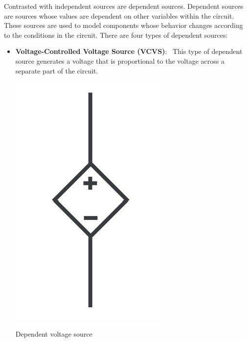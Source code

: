 \documentclass[nobib]{tufte-handout}
\newcommand{\defn}[2]{\noindent\textbf{#1}:\ #2}
\begin{document}
Contrasted with independent sources are 
dependent sources. Dependent sources are sources 
whose values are 
dependent on other variables within the circuit. 
These sources are used to model components whose 
behavior changes according to the conditions in 
the circuit. There are four types of dependent sources:
\begin{itemize}
    \item \defn{Voltage-Controlled Voltage Source (VCVS)}{
    This type of dependent source generates a voltage 
    that is proportional to the voltage across a 
    separate part of the circuit.}
    \begin{marginfigure}
        \centering
        \includegraphics[width=\textwidth/2]{images/dependentvoltagesource.png}
        \caption{Dependent voltage source}
        \label{fig:dependentvoltagesource}
    \end{marginfigure} 


\end{itemize}
\end{document}
